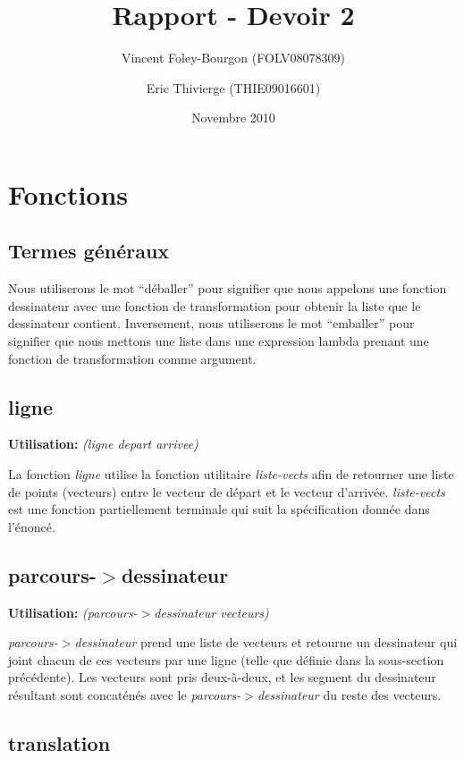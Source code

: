\documentclass[10pt]{article}
\newcommand{\usage}[1]{\textbf{Utilisation: }\emph{#1}}
\begin{document}
\title{Rapport - Devoir 2}
\date{Novembre 2010}
\author{Vincent Foley-Bourgon (FOLV08078309) \and
  Eric Thivierge (THIE09016601)}

\maketitle

\section{Fonctions}

\subsection{Termes généraux}

Nous utiliserons le mot ``déballer'' pour signifier que nous appelons
une fonction dessinateur avec une fonction de transformation pour
obtenir la liste que le dessinateur contient.  Inversement, nous
utiliserons le mot ``emballer'' pour signifier que nous mettons une
liste dans une expression lambda prenant une fonction de
transformation comme argument.


\subsection{ligne}

\usage{(ligne depart arrivee)}

La fonction \emph{ligne} utilise la fonction utilitaire
\emph{liste-vects} afin de retourner une liste de points (vecteurs)
entre le vecteur de départ et le vecteur d'arrivée.
\emph{liste-vects} est une fonction partiellement terminale qui suit
la spécification donnée dans l'énoncé.

\subsection{parcours-$>$dessinateur}

\usage{(parcours-$>$dessinateur vecteurs)}

\emph{parcours-$>$dessinateur} prend une liste de vecteurs et retourne
un dessinateur qui joint chacun de ces vecteurs par une ligne (telle
que définie dans la sous-section précédente).  Les vecteurs sont pris
deux-à-deux, et les segment du dessinateur résultant sont concaténés
avec le \emph{parcours-$>$dessinateur} du reste des vecteurs.


\subsection{translation}
\end{document}
